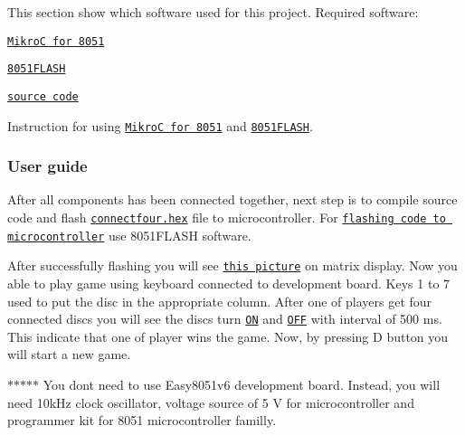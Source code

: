 This section show which software used for this project. Required software\+:
\begin{DoxyItemize}
\item \href{https://www.mikroe.com/mikroc/#8051}{\tt MikroC for 8051}
\item \href{https://www.mikroe.com/mikroc/#8051}{\tt 8051\+F\+L\+A\+SH}
\item \href{https://github.com/djn21/connectfour}{\tt source code}
\end{DoxyItemize}

Instruction for using \href{http://download.mikroe.com/documents/compilers/mikroc/8051/mikroc-8051-manual-v100.pdf}{\tt MikroC for 8051} and \href{https://download.mikroe.com/documents/programmers-debuggers/other/8051prog2/8051flash-programmer-manual-v100.pdf}{\tt 8051\+F\+L\+A\+SH}.

\subsubsection*{User guide}

After all components has been connected together, next step is to compile source code and flash \href{connectfour.hex}{\tt connectfour.\+hex} file to microcontroller. For \href{https://download.mikroe.com/documents/programmers-debuggers/other/8051prog2/8051flash-programmer-manual-v100.pdf}{\tt flashing code to microcontroller} use 8051\+F\+L\+A\+SH software.

After successfully flashing you will see \href{resources/images/game_after_init.jpg}{\tt this picture} on matrix display. Now you able to play game using keyboard connected to development board. Keys 1 to 7 used to put the disc in the appropriate column. After one of players get four connected discs you will see the discs turn \href{resources/images/winners_discs_on.jpg}{\tt ON} and \href{resources/images/winners_discs_off.jpg}{\tt O\+FF} with interval of 500 ms. This indicate that one of player wins the game. Now, by pressing D button you will start a new game.

$\ast$$\ast$$\ast$$\ast$$\ast$ You don\textquotesingle{}t need to use Easy8051v6 development board. Instead, you will need 10k\+Hz clock oscillator, voltage source of 5 V for microcontroller and programmer kit for 8051 microcontroller familly. 